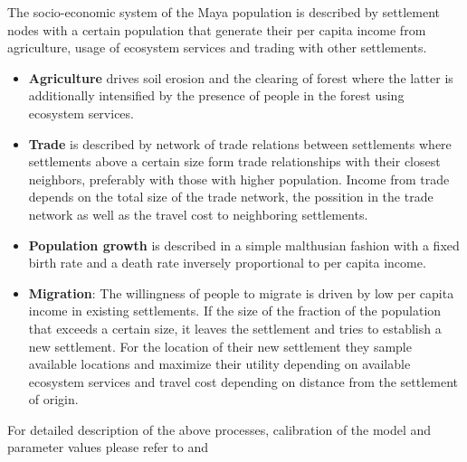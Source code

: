 The socio-economic system of the Maya population is described by settlement nodes with a certain population that generate their per capita income from agriculture, usage of ecosystem services and trading with other settlements. 

\begin{itemize}
	\item \textbf{Agriculture} drives soil erosion and the clearing of forest where the latter is additionally intensified by the presence of people in the forest using ecosystem services. 
	\item \textbf{Trade} is described by network of trade relations between settlements where settlements above a certain size form trade relationships with their closest neighbors, preferably with those with higher population. Income from trade depends on the total size of the trade network, the possition in the trade network as well as the travel cost to neighboring settlements.
	\item \textbf{Population growth} is described in a simple malthusian fashion with a fixed birth rate and a death rate inversely proportional to per capita income.
	\item \textbf{Migration}: The willingness of people to migrate is driven by low per capita income in existing settlements. If the size of the fraction of the population that exceeds a certain size, it leaves the settlement and tries to establish a new settlement. For the location of their new settlement they sample available locations and maximize their utility depending on available ecosystem services and travel cost depending on distance from the settlement of origin.
\end{itemize}
For detailed description of the above processes, calibration of the model and parameter values please refer to \cite{Heckbert2013} and \cite{Heckbert2013model}

